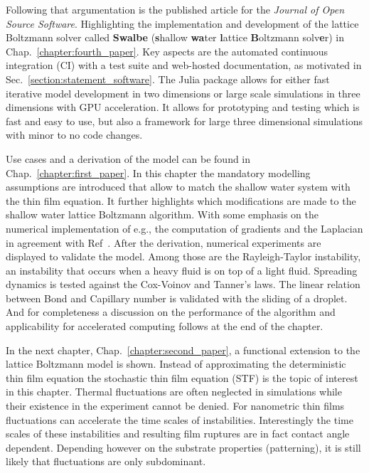 Following that argumentation is the published article for the \textit{Journal of Open Source Software}. 
Highlighting the implementation and development of the lattice Boltzmann solver called \textbf{Swalbe} (\textbf{s}hallow \textbf{wa}ter \textbf{l}attice \textbf{B}oltzmann solv\textbf{e}r) in Chap.~\ref{chapter:fourth_paper}.
Key aspects are the automated continuous integration (CI) with a test suite and web-hosted documentation, as motivated in Sec.~\ref{section:statement_software}.
The Julia package allows for either fast iterative model development in two dimensions or large scale simulations in three dimensions with GPU acceleration.
It allows for prototyping and testing which is fast and easy to use, but also a framework for large three dimensional simulations with minor to no code changes.

Use cases and a derivation of the model can be found in Chap.~\ref{chapter:first_paper}.
In this chapter the mandatory modelling assumptions are introduced that allow to match the shallow water system with the thin film equation.
It further highlights which modifications are made to the shallow water lattice Boltzmann algorithm. 
With some emphasis on the numerical implementation of e.g., the computation of gradients and the Laplacian in agreement with Ref~\cite{junkDiscretizationsIncompressibleNavier2000, thampiIsotropicDiscreteLaplacian2013}. 
After the derivation, numerical experiments are displayed to validate the model. 
Among those are the Rayleigh-Taylor instability, an instability that occurs when a heavy fluid is on top of a light fluid. 
Spreading dynamics is tested against the Cox-Voinov and Tanner's laws. 
The linear relation between Bond and Capillary number is validated with the sliding of a droplet.
And for completeness a discussion on the performance of the algorithm and applicability for accelerated computing follows at the end of the chapter.

In the next chapter, Chap.~\ref{chapter:second_paper}, a functional extension to the lattice Boltzmann model is shown.
Instead of approximating the deterministic thin film equation the stochastic thin film equation (STF) is the topic of interest in this chapter.
Thermal fluctuations are often neglected in simulations while their existence in the experiment cannot be denied.
For nanometric thin films fluctuations can accelerate the time scales of instabilities. 
Interestingly the time scales of these instabilities and resulting film ruptures are in fact contact angle dependent.
Depending however on the substrate properties (patterning), it is still likely that fluctuations are only subdominant.

